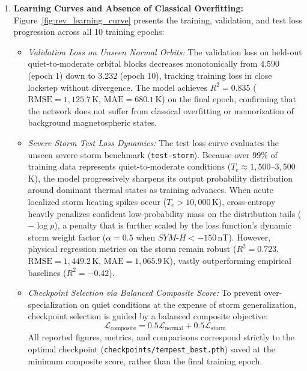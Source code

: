 \documentclass[a4paper,12pt]{article}
\begin{document}
{\begin{enumerate}
    \item \textbf{Learning Curves and Absence of Classical Overfitting:}
    Figure~\ref{fig:rev_learning_curve} presents the training, validation, and test loss progression across all 10 training epochs:
    \begin{itemize}
        \item \emph{Validation Loss on Unseen Normal Orbits:} The validation loss on held-out quiet-to-moderate orbital blocks decreases monotonically from $4.590$ (epoch 1) down to $3.232$ (epoch 10), tracking training loss in close lockstep without divergence. The model achieves $R^2 = 0.835$ ($\text{RMSE} = 1{,}125.7$\,K, $\text{MAE} = 680.1$\,K) on the final epoch, confirming that the network does not suffer from classical overfitting or memorization of background magnetospheric states.
        \item \emph{Severe Storm Test Loss Dynamics:} The test loss curve evaluates the unseen severe storm benchmark (\texttt{test-storm}). Because over $99\%$ of training data represents quiet-to-moderate conditions ($T_e \approx 1{,}500$--$3{,}500$\,K), the model progressively sharpens its output probability distribution around dominant thermal states as training advances. When acute localized storm heating spikes occur ($T_e > 10{,}000$\,K), cross-entropy heavily penalizes confident low-probability mass on the distribution tails ($-\log p$), a penalty that is further scaled by the loss function's dynamic storm weight factor ($\alpha = 0.5$ when $SYM\text{-}H < -150$\,nT). However, physical regression metrics on the storm remain robust ($R^2 = 0.723$, $\text{RMSE} = 1{,}449.2$\,K, $\text{MAE} = 1{,}065.9$\,K), vastly outperforming empirical baselines ($R^2 = -0.42$).
        \item \emph{Checkpoint Selection via Balanced Composite Score:} To prevent over-specialization on quiet conditions at the expense of storm generalization, checkpoint selection is guided by a balanced composite objective:
        \begin{equation}
        \mathcal{L}_{\text{composite}} = 0.5 \mathcal{L}_{\text{normal}} + 0.5 \mathcal{L}_{\text{storm}}
        \end{equation}
        All reported figures, metrics, and comparisons correspond strictly to the optimal checkpoint (\texttt{checkpoints/tempest\_best.pth}) saved at the minimum composite score, rather than the final training epoch.
    \end{itemize}
\end{enumerate}

}
\end{document}
